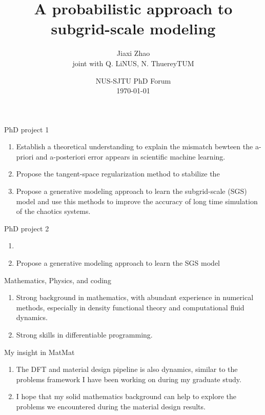 \documentclass[paper slide]{beamer}
\title[Probabilistic SGS modeling]{A probabilistic approach to 
		subgrid-scale modeling}
\author[J. Zhao]{Jiaxi Zhao \\ \small joint with Q. Li\@ NUS, N. Thuerey\@ TUM}
\date[\today]{NUS-SJTU PhD Forum \\ \today}
\begin{document}
\par \setlength{\parindent}{2em}

\begin{frame}
\titlepage
\end{frame}

\begin{frame}{PhD project 1}
	\begin{enumerate}
		\item Establish a theoretical understanding to explain the mismatch bewteen the a-priori
		and a-posteriori error appears in scientific machine learning.
		\item Propose the tangent-space regularization method to stabilize the 
		\item Propose a generative modeling approach to learn the subgrid-scale (SGS) model
		and use this methods to improve the accuracy of long time simulation of the chaotics systems.
	\end{enumerate}
	\footnotetext{}
\end{frame}


\begin{frame}{PhD project 2}
	\begin{enumerate}
		\item 
		\item Propose a generative modeling approach to learn the SGS model
	\end{enumerate}
\end{frame}


\begin{frame}{Mathematics, Physics, and coding}
	\begin{enumerate}
		\item Strong background in mathematics, with abundant experience in numerical methods,
		especially in density functional theory and computational fluid dynamics.
		\item Strong skills in differentiable programming.
	\end{enumerate}
\end{frame}

\begin{frame}{My insight in MatMat}
	\begin{enumerate}
		\item The DFT and material design pipeline is also dynamics, similar to the problems
		framework I have been working on during my graduate study.
		\item I hope that my solid mathematics background can help to explore the problems we
		encountered during the material design results.
	\end{enumerate}
\end{frame}
\end{document}
